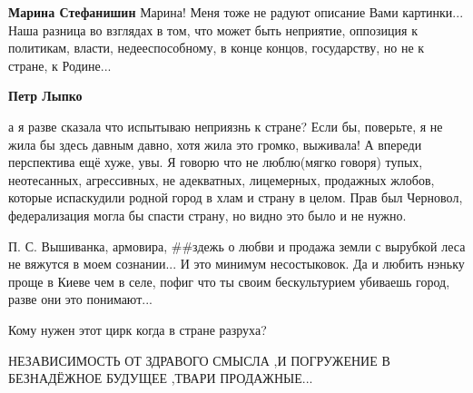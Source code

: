 \begin{itemize}
\begin{itemize}
 
\textbf{Марина Стефанишин} Марина! Меня тоже не радуют описание Вами картинки... Наша разница во взглядах в том, что может быть неприятие, оппозиция к политикам, власти, недееспособному, в конце концов, государству, но не к стране, к Родине...

 
\textbf{Петр Лыпко} 

а я разве сказала что испытываю неприязнь к стране? Если бы, поверьте, я не
жила бы здесь давным давно, хотя жила это громко, выживала! А впереди
перспектива ещё хуже, увы. Я говорю что не люблю(мягко говоря) тупых,
неотесанных, агрессивных, не адекватных, лицемерных, продажных жлобов, которые
испаскудили родной город в хлам и страну в целом. Прав был Черновол,
федерализация могла бы спасти страну, но видно это было и не нужно.

П. С. Вышиванка, армовира, \#\#здежь о любви и продажа земли с вырубкой леса не
вяжутся в моем сознании... И это минимум несостыковок. Да и любить нэньку проще
в Киеве чем в селе, пофиг что ты своим бескультурием убиваешь город, разве они
это понимают...

\end{itemize}

 
Кому нужен этот цирк когда в стране разруха?

 
НЕЗАВИСИМОСТЬ ОТ ЗДРАВОГО СМЫСЛА ,И ПОГРУЖЕНИЕ В БЕЗНАДЁЖНОЕ БУДУЩЕЕ ,ТВАРИ ПРОДАЖНЫЕ...


\end{itemize}

